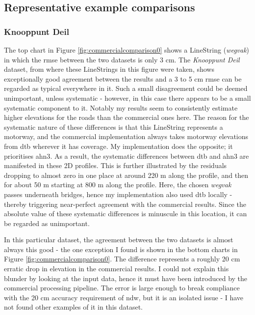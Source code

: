 \subsection{Representative example comparisons}
\label{sub:comparisonexamples}

\subsubsection{Knooppunt Deil}

The top chart in Figure \ref{fig:commercialcomparison0} shows a LineString (\textit{wegvak}) in which the \ac{rmse} between the two datasets is only 3 cm. The \textit{Knooppunt Deil} dataset, from where these LineStrings in this figure were taken, shows exceptionally good agreement between the results and a 3 to 5 cm \ac{rmse} can be regarded as typical everywhere in it. Such a small disagreement could be deemed unimportant, unless systematic - however, in this case there appears to be a small systematic component to it. Notably my results seem to consistently estimate higher elevations for the roads than the commercial ones here. The reason for the systematic nature of these differences is that this LineString represents a motorway, and the commercial implementation always takes motorway elevations from \ac{dtb} wherever it has coverage. My implementation does the opposite; it prioritises \ac{ahn3}. As a result, the systematic differences between \ac{dtb} and \ac{ahn3} are manifested in these 2D profiles. This is further illustrated by the residuals dropping to almost zero in one place at around 220 m along the profile, and then for about 50 m starting at 800 m along the profile. Here, the chosen \textit{wegvak} passes underneath bridges, hence my implementation also used \ac{dtb} locally - thereby triggering near-perfect agreement with the commercial results. Since the absolute value of these systematic differences is minuscule in this location, it can be regarded as unimportant.

In this particular dataset, the agreement between the two datasets is almost always this good - the one exception I found is shown in the bottom charts in Figure \ref{fig:commercialcomparison0}. The difference represents a roughly 20 cm erratic drop in elevation in the commercial results. I could not explain this blunder by looking at the input data, hence it must have been introduced by the commercial processing pipeline. The error is large enough to break compliance with the 20 cm accuracy requirement of \ac{ndw}, but it is an isolated issue - I have not found other examples of it in this dataset.

